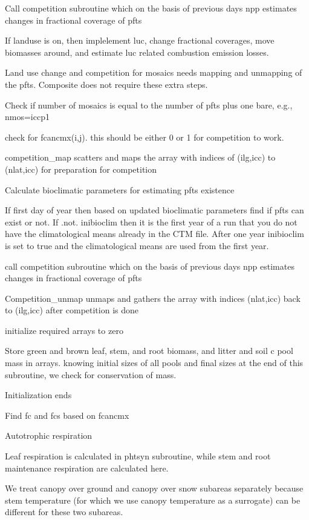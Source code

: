 Call competition subroutine which on the basis of previous day\textquotesingle{}s npp estimates changes in fractional coverage of pfts

If landuse is on, then implelement luc, change fractional coverages, move biomasses around, and estimate luc related combustion emission losses.

Land use change and competition for mosaics needs mapping and unmapping of the pfts. Composite does not require these extra steps.

Check if number of mosaics is equal to the number of pfts plus one bare, e.\+g., nmos=iccp1

check for fcancmx(i,j). this should be either 0 or 1 for competition to work.

competition\+\_\+map scatters and maps the array with indices of (ilg,icc) to (nlat,icc) for preparation for competition

Calculate bioclimatic parameters for estimating pfts existence

If first day of year then based on updated bioclimatic parameters find if pfts can exist or not. If .not. inibioclim then it is the first year of a run that you do not have the climatological means already in the C\+T\+M file. After one year inibioclim is set to true and the climatological means are used from the first year.

call competition subroutine which on the basis of previous day\textquotesingle{}s npp estimates changes in fractional coverage of pfts

Competition\+\_\+unmap unmaps and gathers the array with indices (nlat,icc) back to (ilg,icc) after competition is done

initialize required arrays to zero

Store green and brown leaf, stem, and root biomass, and litter and soil c pool mass in arrays. knowing initial sizes of all pools and final sizes at the end of this subroutine, we check for conservation of mass.

Initialization ends

Find fc and fcs based on fcancmx

Autotrophic respiration

Leaf respiration is calculated in phtsyn subroutine, while stem and root maintenance respiration are calculated here.

We treat canopy over ground and canopy over snow subareas separately because stem temperature (for which we use canopy temperature as a surrogate) can be different for these two subareas.

